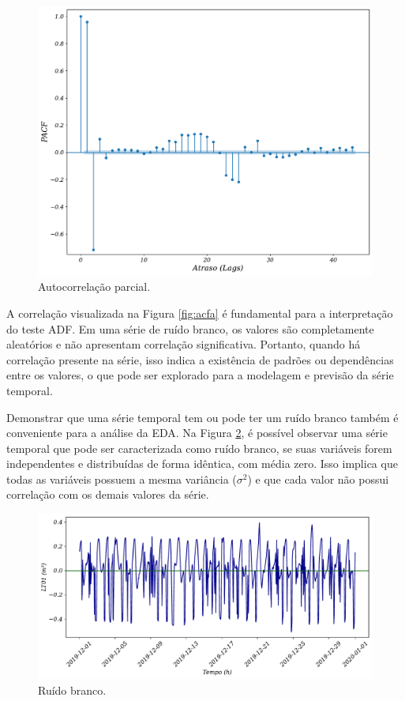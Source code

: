 \begin{figure}[!htb]
	\centering
	\caption{Autocorrelação parcial.}\label{fig:pacf}	\includegraphics[width=0.6\linewidth]{Resultados/Figuras/pacf}
\end{figure}


A correlação visualizada na Figura \ref{fig:acfa} é fundamental para a interpretação do teste ADF. Em uma série de ruído branco, os valores são completamente aleatórios e não apresentam correlação significativa. Portanto, quando há correlação presente na série, isso indica a existência de padrões ou dependências entre os valores, o que pode ser explorado para a modelagem e previsão da série temporal.

Demonstrar que uma série temporal tem ou pode ter um ruído branco também é conveniente para a análise da EDA.
Na Figura \ref{fig:ruido-branco}, é possível observar uma série temporal que pode ser caracterizada como ruído branco, se suas variáveis forem independentes e distribuídas de forma idêntica, com média zero. Isso implica que todas as variáveis possuem a mesma variância ($\sigma^2$) e que cada valor não possui correlação com os demais valores da série.

\begin{figure}[!htb]
	\centering
	\caption{Ruído branco.}
	\label{fig:ruido-branco}
	\includegraphics[width=0.7\linewidth]{Resultados/Figuras/ruido-branco}
\end{figure}


